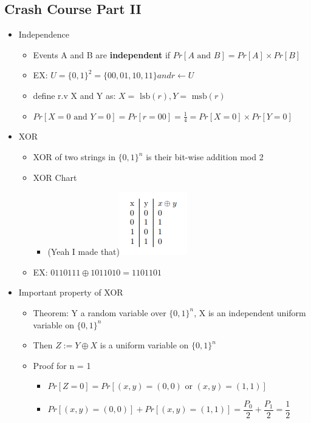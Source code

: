 \documentclass[]{article}
\begin{document}
\subsection{Crash Course Part II}
\begin{itemize}
	\item Independence
	\begin{itemize}
		\item Events A and B are \textbf{independent} if $Pr[A \text{ and } B] = Pr[A] \times Pr[B]$
		\item EX: $U = \{0,1\}^{2} = \{00,01,10,11\} and r \leftarrow U$
		\item define r.v X and Y as: $X = \text{ lsb}(r), Y = \text{ msb}(r)$
		\item $Pr[X=0 \text{ and } Y=0 ] = Pr[r=00] = \frac{1}{4} = Pr[X=0] \times Pr[Y=0]$
	\end{itemize}
	\item XOR
	\begin{itemize}
		\item XOR of two strings in $\{0,1\}^{n}$ is their bit-wise addition mod 2
		\item XOR Chart
		\begin{itemize}
			\item (Yeah I made that)\includegraphics{xor}
		\end{itemize}
		\item EX: $ 0 1 1 0 1 1 1 \oplus 1 0 1 1 0 1 0 = 1 1 0 1 1 0 1$
	\end{itemize}
	\item Important property of XOR
	\begin{itemize}
		\item Theorem: Y a random variable over $\{0,1\}^{n}$, X is an independent uniform variable on $\{0,1\}^{n}$
		\item Then $Z := Y \oplus X$ is a uniform variable on $\{0,1\}^{n}$
		\item Proof for n = 1
		\begin{itemize}
			\item $Pr[Z=0] = Pr[(x,y) = (0,0) \text{ or } (x,y) = (1,1)] $
			\item $Pr[(x,y) = (0,0)] + Pr[(x,y) = (1,1)] = \dfrac{P_{0}}{2} + \dfrac{P_{1}}{2} = \dfrac{1}{2}$

\end{itemize}
\end{itemize}
\end{itemize}
\end{document}
